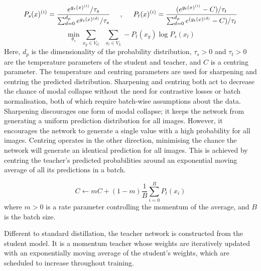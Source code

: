 \documentclass[../thesis.tex]{subfiles}
\begin{document}
\begin{equation}
\label{eq__LTCA__eq_dino_predictions}
    P_{s}(x)^{(i)} =
    \frac{e^{g_{s}(x)^{(i)}}/\tau_{s}}{\sum_{d=0}^{d_p}e^{g_{s}(x)^{(d)}}/\tau_{s}} 
\hspace{5mm}, \hspace{5mm}
        P_{t}(x)^{(i)} =
    \frac{(e^{g_{t}(x)^{(i)}}-C)/\tau_{t}}{\sum_{d=0}^{d_p}e^{(g_{t}(x)^{(d)}}-C)/\tau_{t}}
\end{equation}
\begin{equation}
\label{eq__LTCA__eq_cross_entropy}
    \min\limits_{\theta_{s}}
    \sum_{x_g \in V_G}
    \; \;
    \sum\limits_{x_l \in V_L}  -P_{t}(x_g) \log P_{s}(x_l)
\end{equation}
Here, $d_p$ is the dimensionality of the probability distribution,
$\tau_{s} > 0$ and $\tau_{t} > 0$ are the temperature parameters of the student and teacher, and $C$ is a centring parameter.
The temperature and centring parameters are used for sharpening and centring the predicted distribution. Sharpening and centring both act to decrease the chance of modal collapse without the need for contrastive losses or batch normalisation, both of which require batch-wise assumptions about the data.
Sharpening discourages one form of modal collapse; it keeps the network from generating a uniform prediction distribution for all images. 
However, it encourages the network to generate a single value with a high probability for all images. Centring operates in the other direction, minimising the chance the network will generate an identical prediction for all images. This is achieved by centring the teacher's predicted probabilities around an exponential moving average of all its predictions in a batch.

\begin{equation}
    C \leftarrow mC + (1-m)\frac{1}{B}\sum_{i=0}^{B}P_t(x_i)
\end{equation}
where $m>0$ is a rate parameter controlling the momentum of the average, and $B$ is the batch size.
 
Different to standard distillation, the teacher network is constructed from the student model. It is a momentum teacher \cite{he2020momentum} whose weights are iteratively updated with an exponentially moving average of the student’s weights, which are scheduled to increase throughout training.  
\end{document}
